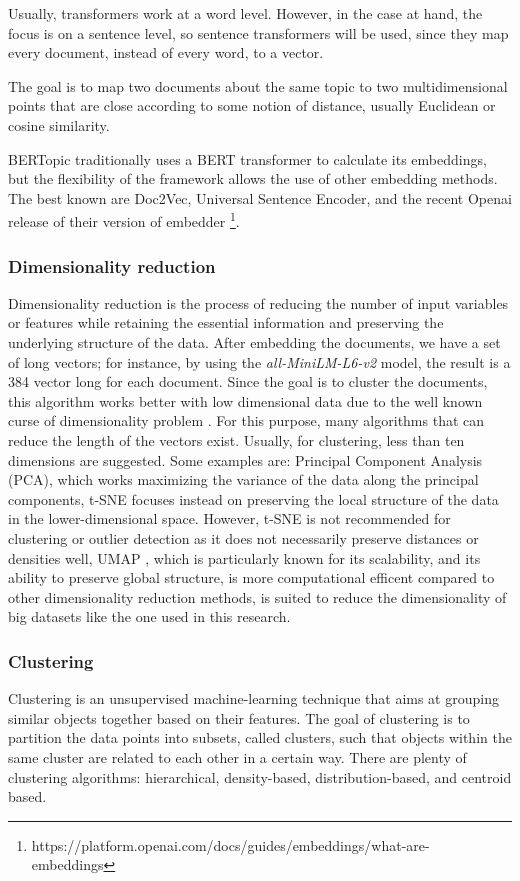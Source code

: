 Usually, transformers work at a word level. However, in the case at hand, the focus is on a sentence level, so  sentence transformers will be used, since they map every document, instead of every word, to a vector.

The goal is to map two documents about the same topic to two multidimensional points that are close according to some notion of distance, usually Euclidean or cosine similarity.

BERTopic traditionally uses a BERT transformer to calculate its embeddings, but the flexibility of the framework allows the use of other embedding methods. The best known are Doc2Vec, Universal Sentence Encoder, and the recent Openai release of their version of embedder \footnote{https://platform.openai.com/docs/guides/embeddings/what-are-embeddings}.

\subsubsection{Dimensionality reduction}
Dimensionality reduction is the process of reducing the number of input variables or features while retaining the essential information and preserving the underlying structure of the data.
After embedding the documents, we have a set of long vectors; for instance, by using the \textit{all-MiniLM-L6-v2} model, the result is a 384 vector long for each document.
Since the goal is to cluster the documents, this algorithm works better with low dimensional data due to the well known curse of dimensionality problem \cite{steinbach_dimensionality_2004}. 
For this purpose,  many algorithms  that can reduce the length of the vectors exist. Usually, for clustering,  less than ten dimensions are suggested.
Some examples are:
Principal Component Analysis \cite{mackiewicz_principal_1993}(PCA), which works maximizing the variance of the data along the principal components, 
t-SNE \cite{JMLR:v9:vandermaaten08a}focuses instead on preserving the local structure of the data in the lower-dimensional space. However, t-SNE is not recommended for clustering or outlier detection as it does not necessarily preserve distances or densities well, 
UMAP \cite{McInnes2018}, which is particularly known for its scalability, and its ability to preserve global structure, is more computational efficent compared to other dimensionality reduction methods, is suited to reduce the dimensionality of big datasets like the one used in this research.

\subsubsection{Clustering}
Clustering is an unsupervised machine-learning technique that aims at grouping similar objects together based on their features. The goal of clustering is to partition the data points into subsets, called clusters, such that objects within the same cluster are related to each other in a certain way. There are plenty of clustering algorithms: hierarchical, density-based, distribution-based, and centroid based.

